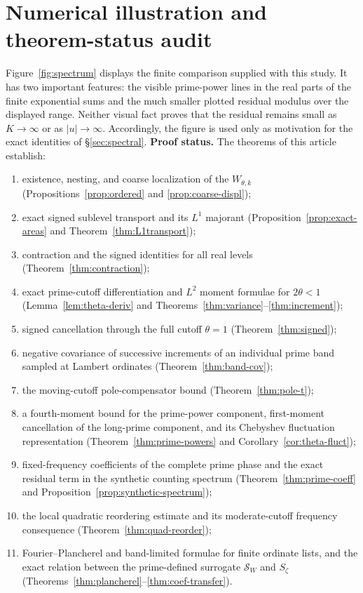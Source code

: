 \documentclass[11pt,leqno]{amsart}
\numberwithin{equation}{section}
\theoremstyle{definition}
\theoremstyle{remark}
\newcommand{\1}{\mathbf 1}
\newcommand{\Sc}{\mathscr S}
\begin{document}
\section{Numerical illustration and theorem-status audit}\label{sec:audit}
Figure~\ref{fig:spectrum} displays the finite comparison supplied with this study. It has two important features: the visible prime-power lines in the real parts of the finite exponential sums and the much smaller plotted residual modulus over the displayed range. Neither visual fact proves that the residual remains small as $K\to\infty$ or as $|u|\to\infty$. Accordingly, the figure is used only as motivation for the exact identities of \S\ref{sec:spectral}.
\medskip
\noindent\textbf{Proof status.} The theorems of this article establish:
\begin{enumerate}
\item existence, nesting, and coarse localization of the $W_{\theta,k}$ (Propositions~\ref{prop:ordered} and \ref{prop:coarse-displ});
\item exact signed sublevel transport and its $L^1$ majorant (Proposition~\ref{prop:exact-areas} and Theorem~\ref{thm:L1transport});
\item contraction and the signed identities for all real levels (Theorem~\ref{thm:contraction});
\item exact prime-cutoff differentiation and $L^2$ moment formulae for $2\theta<1$ (Lemma~\ref{lem:theta-deriv} and Theorems~\ref{thm:variance}--\ref{thm:increment});
\item signed cancellation through the full cutoff $\theta=1$ (Theorem~\ref{thm:signed});
\item negative covariance of successive increments of an individual prime band sampled at Lambert ordinates (Theorem~\ref{thm:band-cov});
\item the moving-cutoff pole-compensator bound (Theorem~\ref{thm:pole-t});
\item a fourth-moment bound for the prime-power component, first-moment cancellation of the long-prime component, and its Chebyshev fluctuation representation (Theorem~\ref{thm:prime-powers} and Corollary~\ref{cor:theta-fluct});
\item fixed-frequency coefficients of the complete prime phase and the exact residual term in the synthetic counting spectrum (Theorem~\ref{thm:prime-coeff} and Proposition~\ref{prop:synthetic-spectrum});
\item the local quadratic reordering estimate and its moderate-cutoff frequency consequence (Theorem~\ref{thm:quad-reorder});
\item Fourier--Plancherel and band-limited formulae for finite ordinate lists, and the exact relation between the prime-defined surrogate $\Sc_W$ and $S_\zeta$ (Theorems~\ref{thm:plancherel}--\ref{thm:coef-transfer}).
\end{enumerate}
\end{document}
